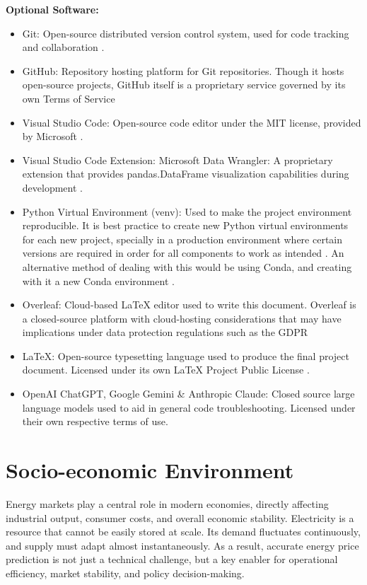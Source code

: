 \documentclass[12pt]{report} %
\begin{document}
\noindent \textbf{Optional Software:}
\begin{itemize}
    \item Git: Open-source distributed version control system, used for code tracking and collaboration \cite{git}.
    
    \item GitHub: Repository hosting platform for Git repositories. Though it hosts open-source projects, GitHub itself is a proprietary service governed by its own Terms of Service \cite{github}
    
    \item Visual Studio Code: Open-source code editor under the MIT license, provided by Microsoft \cite{vscode}.
    
    \item Visual Studio Code Extension: Microsoft Data Wrangler: A proprietary extension that provides pandas.DataFrame visualization capabilities during development \cite{VSCode_DataWrangler}.

    \item Python Virtual Environment (venv): Used to make the project environment reproducible. It is best practice to create new Python virtual environments for each new project, specially in a production environment where certain versions are required in order for all components to work as intended \cite{python_venv}. An alternative method of dealing with this would be using Conda, and creating with it a new Conda environment \cite{conda}.

    \item Overleaf: Cloud-based LaTeX editor used to write this document. Overleaf is a closed-source platform with cloud-hosting considerations that may have implications under data protection regulations such as the GDPR \cite{overleaf}
    
    \item LaTeX: Open-source typesetting language used to produce the final project document. Licensed under its own LaTeX Project Public License \cite{latex}.

    \item OpenAI ChatGPT, Google Gemini \& Anthropic Claude: Closed source large language models used to aid in general code troubleshooting. Licensed under their own respective terms of use. 
\end{itemize}



\chapter{Socio-economic Environment}
\label{chap:06}
Energy markets play a central role in modern economies, directly affecting industrial output, consumer costs, and overall economic stability. Electricity is a resource that cannot be easily stored at scale. Its demand fluctuates continuously, and supply must adapt almost instantaneously. As a result, accurate energy price prediction is not just a technical challenge, but a key enabler for operational efficiency, market stability, and policy decision-making.
\end{document}
